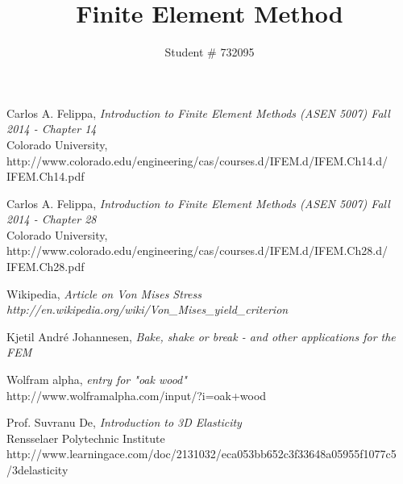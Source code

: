 \documentclass[9pt]{extarticle}
\title{Finite Element Method}
\author{Student \# 732095 }
\begin{document}
\maketitle































\newpage
\begin{thebibliography}{3}

	Carlos A. Felippa, \emph{Introduction to Finite Element Methods (ASEN 5007) Fall 2014  - Chapter 14} \\
	 Colorado University, \\	http://www.colorado.edu/engineering/cas/courses.d/IFEM.d/IFEM.Ch14.d/\\IFEM.Ch14.pdf



Carlos A. Felippa, \emph{Introduction to Finite Element Methods (ASEN 5007) Fall 2014  - Chapter 28} \\	
 Colorado University, \\	http://www.colorado.edu/engineering/cas/courses.d/IFEM.d/IFEM.Ch28.d/\\IFEM.Ch28.pdf


Wikipedia, \emph{Article on Von Mises Stress} \\
\emph{http://en.wikipedia.org/wiki/Von\_Mises\_yield\_criterion}

Kjetil André Johannesen, 
\emph{Bake, shake or break - and other applications for the FEM}

	Wolfram alpha, \emph{entry for "oak wood"}\\
	http://www.wolframalpha.com/input/?i=oak+wood
	
	Prof. Suvranu De, \emph{Introduction to 3D Elasticity} \\
	Rensselaer Polytechnic Institute \\
	http://www.learningace.com/doc/2131032/eca053bb652c3f33648a05955f1077c5\\/3delasticity


\end{thebibliography}
\end{document}
